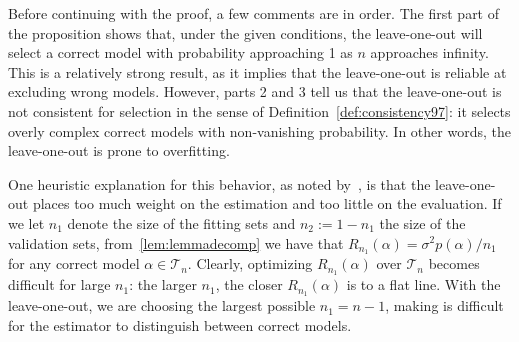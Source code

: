 \documentclass[11pt, letter paper]{article}
\newcommand{\1}{\mathmybb{1}}
\newcommand{\0}{\emptyset}
\newcommand{\Tcal}{\mathcal{T}_{n}}
\begin{document}
Before continuing with the proof, a few comments are in order. The first part of the proposition shows that, under the given conditions, the leave-one-out will select a correct model with probability approaching 1 as \(n\) approaches infinity. This is a relatively strong result, as it implies that the leave-one-out is reliable at excluding wrong models. However, parts 2 and 3 tell us that the leave-one-out is not consistent for selection in the sense of Definition~\ref{def:consistency97}: it selects overly complex correct models with non-vanishing probability. In other words, the leave-one-out is prone to overfitting.

One heuristic explanation for this behavior, as noted by~\textcite{shao_1993}, is that the leave-one-out places too much weight on the estimation and too little on the evaluation. If we let \(n_{1}\) denote the size of the fitting sets and \(n_{2}:=1-n_{1}\) the size of the validation sets, from~\ref{lem:lemmadecomp} we have that \(R_{n_{1}}(\alpha) = \sigma^{2}p(\alpha)/n_{1}\) for any correct model \(\alpha\in\Tcal\). Clearly, optimizing \(R_{n_{1}}(\alpha)\) over \(\Tcal\) becomes difficult for large \(n_{1}\): the larger \(n_{1}\), the closer \(R_{n_{1}}(\alpha)\) is to a flat line. With the leave-one-out, we are choosing the largest possible \(n_{1}= n-1\), making is difficult for the estimator to distinguish between correct models.
\end{document}
